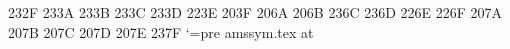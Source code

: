 \newsymbol\nshortparallel 232F
\newsymbol{}
\newsymbol{}
\newsymbol{}
\newsymbol{}
\newsymbol{}
\newsymbol{}
\newsymbol{}
\newsymbol{}
\newsymbol{}
\newsymbol{}
\newsymbol\nLeftarrow 233A
\newsymbol\nRightarrow 233B
\newsymbol\nLeftrightarrow 233C
\newsymbol\nleftrightarrow 233D
\newsymbol\divideontimes 223E
\newsymbol\varnothing 203F
\newsymbol{}
\newsymbol{}
\newsymbol{}
\newsymbol{}
\newsymbol{}
\newsymbol{}
\newsymbol{}
\newsymbol\gimel 206A
\newsymbol\daleth 206B
\newsymbol\lessdot 236C
\newsymbol\gtrdot 236D
\newsymbol\ltimes 226E
\newsymbol\rtimes 226F
\newsymbol{}
\newsymbol{}
\newsymbol{}
\newsymbol{}
\newsymbol{}
\newsymbol{}
\newsymbol{}
\newsymbol{}
\newsymbol{}
\newsymbol{}
\newsymbol\digamma 207A
\newsymbol\varkappa 207B
\newsymbol\Bbbk 207C
\newsymbol\hslash 207D
\undefine\hbar
\newsymbol\hbar 207E
\newsymbol\backepsilon 237F
\catcode`\@=\csname pre amssym.tex at\endcsname

\endinput
